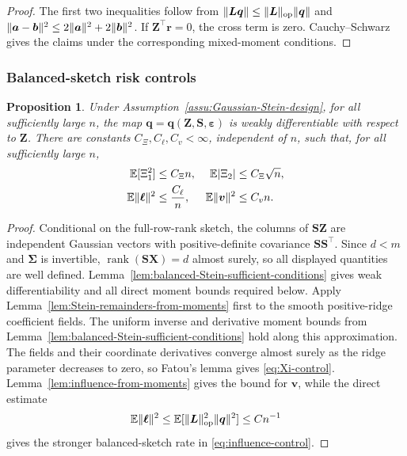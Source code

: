\documentclass{article}
\theoremstyle{plain}
\newtheorem{proposition}[theorem]{Proposition}
\theoremstyle{definition}
\theoremstyle{definition}
\DeclarePairedDelimiter\norm{\lVert}{\rVert}
\DeclareMathOperator{\rank}{rank}
\def\E{{\mathbb{E}}}
\def\mathbold{\boldsymbol}
\def\ba{\mathbold{a}}\def\bfa{\mathbold{a}}\def\ahat{\widehat{a}}\def\atil{\widetilde{a}}
\def\bb{\mathbold{b}}\def\bhat{\widehat{b}}\def\btil{\widetilde{b}}
\def\bell{\mathbold{\ell}}\def\ellhat{\widehat{\ell}}\def\elltil{\widetilde{\ell}}\def\ellbar{{\overline \ell}}
\def\bL{\mathbold{L}}\def\hbL{{\widehat{\bL}}}\def\tbL{{\widetilde{\bL}}}
\def\bq{\mathbold{q}}\def\qhat{\widehat{q}}\def\qtil{\widetilde{q}}\def\qbar{{\overline q}}
\def\br{\mathbold{r}}\def\rhat{\widehat{r}}\def\rtil{\widetilde{r}}\def\rbar{{\overline r}}
\def\bS{\mathbold{S}}\def\hbS{{\widehat{\bS}}}\def\tbS{{\widetilde{\bS}}}
\def\bv{\mathbold{v}}\def\vhat{\widehat{v}}\def\vtil{\widetilde{v}}\def\vbar{{\overline v}}
\def\bX{\mathbold{X}}\def\hbX{{\widehat{\bX}}}\def\tbX{{\tilde{\bX}}}\def\bXbar{{\overline \bX}}
\def\bZ{\mathbold{Z}}\def\hbZ{{\widehat{\bZ}}}\def\tbZ{{\widetilde{\bZ}}}
\def\ep{\varepsilon}\def\eps{\epsilon}\def\veps{\varepsilon}
\def\bep{ {\mathbold{\ep} }}
\def\bSigma{\mathbold{\Sigma}}\def\hbSigma{{\widehat{\bSigma}}}
\begin{document}
\begin{proof}
The first two inequalities follow from
$\norm{\bL\bq}\leq\norm{\bL}_{\rm op}\norm{\bq}$ and
$\norm{\ba-\bb}^2\leq2\norm{\ba}^2+2\norm{\bb}^2$.
If $\bZ^\top\br=0$, the cross term is zero.  Cauchy--Schwarz gives the
claims under the corresponding mixed-moment conditions.
\end{proof}

\subsubsection{Balanced-sketch risk controls}
\label{app:proof-Stein-risk-from-moments}

\begin{proposition}
\label{prop:Stein-risk-from-moments}
Under Assumption~\ref{assu:Gaussian-Stein-design}, for all sufficiently large
$n$, the map $\bq=\bq(\bZ,\bS,\bep)$ is weakly differentiable with respect to $\bZ$.
There are constants $C_\Xi,C_\ell,C_v<\infty$, independent of $n$, such that,
for all sufficiently large $n$,
\begin{align}
    \E[\Xi_1^2]&\leq C_\Xi n,
    &
    \E|\Xi_2|&\leq C_\Xi\sqrt n,
    \label{eq:Xi-control}\\
    \E\norm{\bell}^2&\leq \frac{C_\ell}{n},
    &
    \E\norm{\bv}^2&\leq C_v n.
    \label{eq:influence-control}
\end{align}
\end{proposition}

\begin{proof}
Conditional on the full-row-rank sketch, the columns of $\bS\bZ$ are
independent Gaussian vectors with positive-definite covariance
$\bS\bS^\top$.  Since $d<m$ and $\bSigma$ is invertible,
$\rank(\bS\bX)=d$ almost surely, so all displayed quantities are well defined.
Lemma~\ref{lem:balanced-Stein-sufficient-conditions} gives weak
differentiability and all direct moment bounds required below.
Apply Lemma~\ref{lem:Stein-remainders-from-moments} first to the smooth
positive-ridge coefficient fields. The uniform inverse and derivative
moment bounds from Lemma~\ref{lem:balanced-Stein-sufficient-conditions}
hold along this approximation. The fields and their coordinate derivatives
converge almost surely as the ridge parameter decreases to zero, so Fatou's
lemma gives \eqref{eq:Xi-control}. Lemma~\ref{lem:influence-from-moments}
gives the bound for $\bv$, while the direct estimate
\begin{align*}
    \E\norm{\bell}^2
    \leq \E[\norm{\bL}_{\rm op}^2\norm{\bq}^2]
    \leq Cn^{-1}
\end{align*}
gives the stronger balanced-sketch rate in \eqref{eq:influence-control}.
\end{proof}
\end{document}
